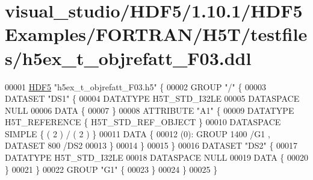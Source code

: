 \hypertarget{visual__studio_2_h_d_f5_21_810_81_2_h_d_f5_examples_2_f_o_r_t_r_a_n_2_h5_t_2testfiles_2h5ex__t__objrefatt___f03_8ddl_source}{}\section{visual\+\_\+studio/\+H\+D\+F5/1.10.1/\+H\+D\+F5\+Examples/\+F\+O\+R\+T\+R\+A\+N/\+H5\+T/testfiles/h5ex\+\_\+t\+\_\+objrefatt\+\_\+\+F03.ddl}
\label{visual__studio_2_h_d_f5_21_810_81_2_h_d_f5_examples_2_f_o_r_t_r_a_n_2_h5_t_2testfiles_2h5ex__t__objrefatt___f03_8ddl_source}

\begin{DoxyCode}
00001 \hyperlink{namespace_h_d_f5}{HDF5} \textcolor{stringliteral}{"h5ex\_t\_objrefatt\_F03.h5"} \{
00002 GROUP \textcolor{stringliteral}{"/"} \{
00003    DATASET \textcolor{stringliteral}{"DS1"} \{
00004       DATATYPE  H5T\_STD\_I32LE
00005       DATASPACE  NULL
00006       DATA \{
00007       \}
00008       ATTRIBUTE \textcolor{stringliteral}{"A1"} \{
00009          DATATYPE  H5T\_REFERENCE \{ H5T\_STD\_REF\_OBJECT \}
00010          DATASPACE  SIMPLE \{ ( 2 ) / ( 2 ) \}
00011          DATA \{
00012          (0): GROUP 1400 /G1 , DATASET 800 /DS2 
00013          \}
00014       \}
00015    \}
00016    DATASET \textcolor{stringliteral}{"DS2"} \{
00017       DATATYPE  H5T\_STD\_I32LE
00018       DATASPACE  NULL
00019       DATA \{
00020       \}
00021    \}
00022    GROUP \textcolor{stringliteral}{"G1"} \{
00023    \}
00024 \}
00025 \}
\end{DoxyCode}
